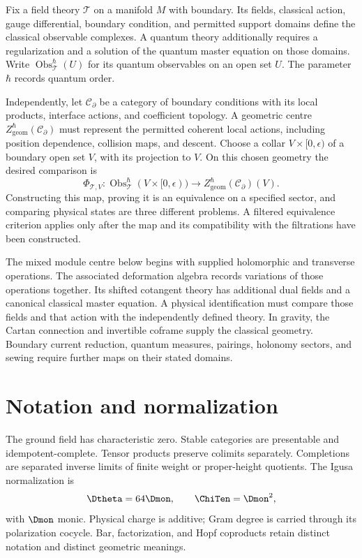 \documentclass[11pt,twoside,openright]{memoir}
\begin{document}
Fix a field theory $\mathcal T$ on a manifold $M$ with boundary. Its fields, classical action, gauge differential, boundary condition, and permitted support domains define the classical observable complexes. A quantum theory additionally requires a regularization and a solution of the quantum master equation on those domains. Write $\operatorname{Obs}_{\mathcal T}^{\hbar}(U)$ for its quantum observables on an open set $U$. The parameter $\hbar$ records quantum order.

Independently, let $\mathcal C_{\partial}$ be a category of boundary conditions with its local products, interface actions, and coefficient topology. A geometric centre $Z_{\mathrm{geom}}^{\hbar}(\mathcal C_{\partial})$ must represent the permitted coherent local actions, including position dependence, collision maps, and descent. Choose a collar $V\times[0,\epsilon)$ of a boundary open set $V$, with its projection to $V$. On this chosen geometry the desired comparison is
\[
 \Phi_{\mathcal T,V}:\operatorname{Obs}_{\mathcal T}^{\hbar}(V\times[0,\epsilon))
 \longrightarrow Z_{\mathrm{geom}}^{\hbar}(\mathcal C_{\partial})(V).
\]
Constructing this map, proving it is an equivalence on a specified sector, and comparing physical states are three different problems. A filtered equivalence criterion applies only after the map and its compatibility with the filtrations have been constructed.

The mixed module centre below begins with supplied holomorphic and transverse operations. The associated deformation algebra records variations of those operations together. Its shifted cotangent theory has additional dual fields and a canonical classical master equation. A physical identification must compare those fields and that action with the independently defined theory. In gravity, the Cartan connection and invertible coframe supply the classical geometry. Boundary current reduction, quantum measures, pairings, holonomy sectors, and sewing require further maps on their stated domains.

\chapter*{Notation and normalization}
The ground field has characteristic zero.  Stable categories are presentable and idempotent-complete.  Tensor products preserve colimits separately.  Completions are separated inverse limits of finite weight or proper-height quotients.  The Igusa normalization is
\[
 \Dtheta=64\Dmon,\qquad \ChiTen=\Dmon^2,
\]
with $\Dmon$ monic.  Physical charge is additive; Gram degree is carried through its polarization cocycle.  Bar, factorization, and Hopf coproducts retain distinct notation and distinct geometric meanings.

\tableofcontents
\mainmatter







\backmatter


\end{document}

